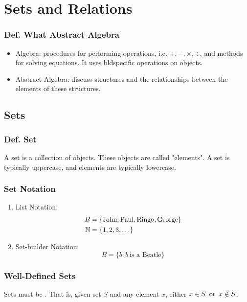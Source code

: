 \section{Sets and Relations}

\subsubsection{Def. What  Abstract Algebra}
\begin{itemize}
    \item Algebra: procedures for performing operations, i.e. $+,-,\times,\div$, and methods for solving equations. It uses bld{specific} operations on  objects.
    \item Abstract Algebra: discuss  structures and the relationships between the elements of these structures.
\end{itemize}

\subsection{Sets}

\subsubsection{Def. Set}
A set is a collection of objects. These objects are called "elements". A set is typically uppercase, and elements are typically lowercase.

\subsubsection*{Set Notation}
\begin{enumerate}
    \item List Notation:
    \begin{align*}
        B & = \{\text{John}, \text{Paul}, \text{Ringo}, \text{George}\} \\
        \mathbb{N} & = \{1,2,3,\ldots\}
    \end{align*}
    \item Set-builder Notation:
    \[
        B = \{b : b ~\text{is a Beatle}\}
    \]
\end{enumerate}

\subsubsection*{Well-Defined Sets}
Sets must be . That is, given set $S$ and any element $x$, either $x \in S \operatorname{~\text{or}~} x \notin S$.

